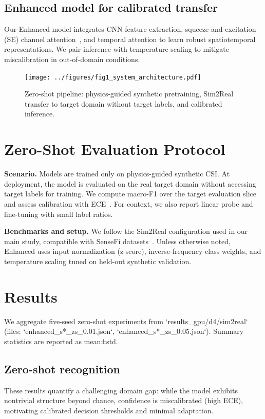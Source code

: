 \documentclass[journal]{IEEEtran}
\begin{document}
\subsection{Enhanced model for calibrated transfer}
Our Enhanced model integrates CNN feature extraction, squeeze-and-excitation (SE) channel attention~\cite{se_networks2018}, and temporal attention to learn robust spatiotemporal representations. We pair inference with temperature scaling to mitigate miscalibration in out-of-domain conditions.

\begin{figure}[t]
\centering
\texttt{[image: ../figures/fig1\_system\_architecture.pdf]}
\caption{Zero-shot pipeline: physics-guided synthetic pretraining, Sim2Real transfer to target domain without target labels, and calibrated inference.}
\label{fig:zs_pipeline}
\end{figure}

\section{Zero-Shot Evaluation Protocol}
\textbf{Scenario.} Models are trained only on physics-guided synthetic CSI. At deployment, the model is evaluated on the real target domain without accessing target labels for training. We compute macro-F1 over the target evaluation slice and assess calibration with ECE~\cite{calibration_guo2017}. For context, we also report linear probe and fine-tuning with small label ratios.

\textbf{Benchmarks and setup.} We follow the Sim2Real configuration used in our main study, compatible with SenseFi datasets~\cite{yang2023sensefi}. Unless otherwise noted, Enhanced uses input normalization (z-score), inverse-frequency class weights, and temperature scaling tuned on held-out synthetic validation.

\section{Results}
We aggregate five-seed zero-shot experiments from `results\_gpu/d4/sim2real` (files: `enhanced_s*_zs_0.01.json`, `enhanced_s*_zs_0.05.json`). Summary statistics are reported as mean±std.

\subsection{Zero-shot recognition}
These results quantify a challenging domain gap: while the model exhibits nontrivial structure beyond chance, confidence is miscalibrated (high ECE), motivating calibrated decision thresholds and minimal adaptation.
\end{document}
